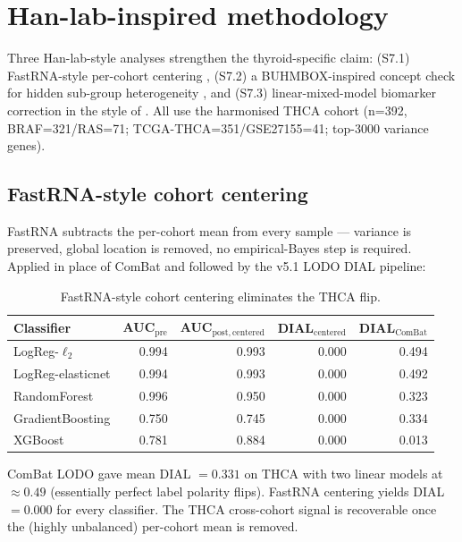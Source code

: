 \documentclass[11pt,a4paper]{article}
\begin{document}
\section{Han-lab-inspired methodology}
\label{sec:S7}

Three Han-lab-style analyses strengthen the thyroid-specific claim:
(S7.1) FastRNA-style per-cohort centering \citep{lee2022fastrna},
(S7.2) a BUHMBOX-inspired concept check for hidden sub-group
heterogeneity \citep{han2016buhmbox}, and (S7.3) linear-mixed-model
biomarker correction in the style of \citep{sul2018population}. All
use the harmonised THCA cohort (n=392, BRAF=321/RAS=71;
TCGA-THCA=351/GSE27155=41; top-3000 variance genes).

\subsection{FastRNA-style cohort centering}
\label{sec:S7.1}
FastRNA subtracts the per-cohort mean from every sample --- variance
is preserved, global location is removed, no empirical-Bayes step is
required. Applied in place of ComBat and followed by the v5.1 LODO
DIAL pipeline:

\begin{table}[htbp]
\centering
\small
\begin{tabular}{lrrrr}\toprule
Classifier & AUC$_{\mathrm{pre}}$ & AUC$_{\mathrm{post,centered}}$ & DIAL$_{\mathrm{centered}}$ & DIAL$_{\mathrm{ComBat}}$ \\ \midrule
LogReg-$\ell_2$      & 0.994 & 0.993 & 0.000 & 0.494 \\
LogReg-elasticnet    & 0.994 & 0.993 & 0.000 & 0.492 \\
RandomForest         & 0.996 & 0.950 & 0.000 & 0.323 \\
GradientBoosting     & 0.750 & 0.745 & 0.000 & 0.334 \\
XGBoost              & 0.781 & 0.884 & 0.000 & 0.013 \\
\bottomrule\end{tabular}
\caption{FastRNA-style cohort centering eliminates the THCA flip.}
\label{tab:s7a}
\end{table}

ComBat LODO gave mean DIAL $=0.331$ on THCA with two linear models at
$\approx 0.49$ (essentially perfect label polarity flips). FastRNA
centering yields DIAL $= 0.000$ for every classifier. The THCA
cross-cohort signal is recoverable once the (highly unbalanced)
per-cohort mean is removed.
\end{document}
